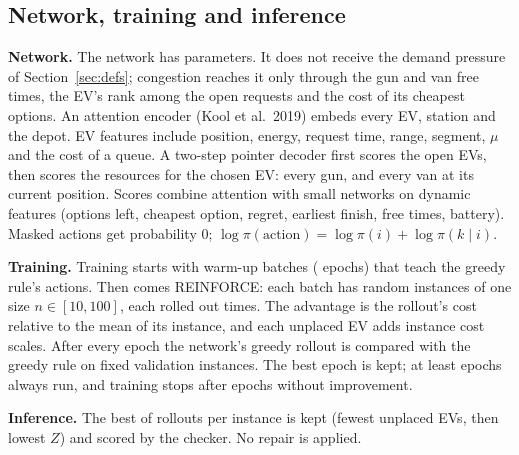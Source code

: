 \subsection{Network, training and inference}
\textbf{Network.} The network has \NParams{} parameters. It does not receive the demand pressure of Section~\ref{sec:defs}; congestion reaches it only through the gun and van free times, the EV's rank among the open requests and the cost of its cheapest options. An attention encoder (Kool et al.\ 2019) embeds every EV, station and the depot. EV features include position, energy, request time, range, segment, $\mu$ and the cost of a queue. A two-step pointer decoder first scores the open EVs, then scores the resources for the chosen EV: every gun, and every van at its current position. Scores combine attention with small networks on dynamic features (options left, cheapest option, regret, earliest finish, free times, battery). Masked actions get probability 0; $\log\pi(\text{action})=\log\pi(i)+\log\pi(k\mid i)$.

\textbf{Training.} Training starts with \ImitBatches{} warm-up batches (\ImitEpochs{} epochs) that teach the greedy rule's actions. Then comes REINFORCE: each batch has \BatchInst{} random instances of one size $n\in[10,100]$, each rolled out \TrainSamples{} times. The advantage is the rollout's cost relative to the mean of its instance, and each unplaced EV adds \DropPenalty{} instance cost scales. After every epoch the network's greedy rollout is compared with the greedy rule on fixed validation instances. The best epoch is kept; at least \MinEpochs{} epochs always run, and training stops after \Patience{} epochs without improvement.

\textbf{Inference.} The best of \Rollouts{} rollouts per instance is kept (fewest unplaced EVs, then lowest $Z$) and scored by the checker. No repair is applied.

\begin{table}[H]\centering\small
\caption{Network, training, inference and hardware settings (, , ).}\label{tab:settings}

\end{table}

